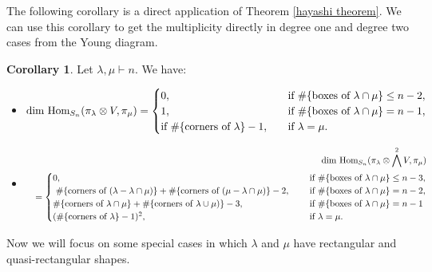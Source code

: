 \documentclass[11pt]{amsart}
\numberwithin{equation}{section}
\theoremstyle{definition}
\newtheorem{corollary}[thm]{Corollary}
\begin{document}
The following corollary is a direct application of Theorem \ref{hayashi theorem}. We can use this corollary to get the multiplicity directly in degree one and degree two cases from the Young diagram.
\begin{corollary} 
Let \(\lambda, \mu \vdash n\). We have:
\begin{itemize}
    \item[(1)]
    \begin{equation*}
    \textnormal{dim}\ \textnormal{Hom}_{S_{n}}(\pi_{\lambda}\otimes V, \pi_{\mu})= 
    \begin{cases}
        0,\quad & \textnormal{if}\ \#\{\textnormal{boxes}\ \textnormal{of}\ \lambda\cap\mu\}\leq n-2,\\
        1,\quad & \textnormal{if}\  \#\{\textnormal{boxes}\ \textnormal{of}\  \lambda\cap\mu\}=n-1,\\
        \textnormal{if}\ \#\{\textnormal{corners}\ \textnormal{of}\ \lambda\}-1,\quad & \mbox{if \(\lambda=\mu\)}.
    \end{cases}
     \end{equation*}
    \item[(2)] 
    \begin{eqnarray*}
    &&\textnormal{dim}\ \textnormal{Hom}_{S_{n}}(\pi_{\lambda}\otimes\bigwedge^{2}V, \pi_{\mu})\\&&= 
    \begin{cases}
        0,\quad & \ \textnormal{if}\ \#\{\textnormal{boxes}\ \textnormal{of}\  \lambda\cap\mu\}\leq n-3,\\ 
       \  \#\{\textnormal{corners}\ \textnormal{of}\ (\lambda-\lambda\cap\mu)\}+\#\{\textnormal{corners}\ \textnormal{of}\ (\mu-\lambda\cap\mu)\}-2,\quad &  \   \textnormal{if}\ \#\{\textnormal{boxes}\ \textnormal{of}\  \lambda\cap\mu\}=n-2,\\
        \#\{\textnormal{corners}\ \textnormal{of}\ \lambda\cap\mu\}+\#\{\textnormal{corners}\ \textnormal{of}\ \lambda\cup\mu)\}-3,\quad & \  \textnormal{if}\ \#\{\textnormal{boxes}\ \textnormal{of}\  \lambda\cap\mu\}=n-1\\
        (\#\{\textnormal{corners}\ \textnormal{of}\ \lambda\}-1)^{2},\quad & \  \textnormal{if}\  \lambda=\mu.
    \end{cases}
   \end{eqnarray*}
\end{itemize}

\end{corollary}

Now we will focus on some special cases in which $\lambda$ and $\mu$ have rectangular and quasi-rectangular shapes.
\end{document}
